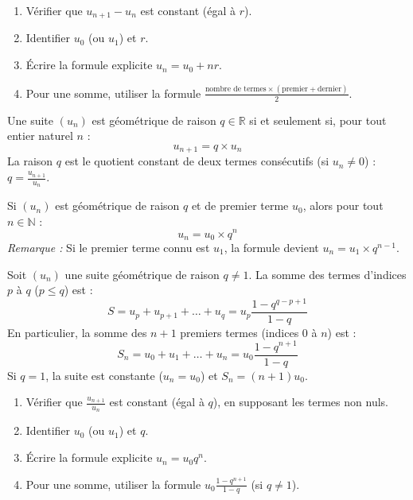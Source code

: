 \documentclass[11pt]{article}
\newcommand{\cle}[1]{{\popxbold\color{popdark}#1}}
\newcounter{popsec}
\newcounter{popsub}
\newcommand{\courssub}[1]{%
  \stepcounter{popsub}%
  \par\vspace{9pt}\noindent{\popxbold\fontsize{11.5}{13}\selectfont\color{popink}{\color{poporange}\thepopsec.\thepopsub}\hspace{6pt}#1}\par\nopagebreak\vspace{4pt}
}
\begin{document}
\begin{methode}
\begin{enumerate}
\item Vérifier que $u_{n+1} - u_n$ est constant (égal à $r$).
\item Identifier $u_0$ (ou $u_1$) et $r$.
\item Écrire la formule explicite $u_n = u_0 + nr$.
\item Pour une somme, utiliser la formule $\frac{\text{nombre de termes} \times (\text{premier} + \text{dernier})}{2}$.
\end{enumerate}
\end{methode}

\courssub{Suites géométriques}

\begin{definition}
Une suite $(u_n)$ est \cle{géométrique} de raison $q \in \mathbb{R}$ si et seulement si, pour tout entier naturel $n$ :
\[ u_{n+1} = q \times u_n \]
La raison $q$ est le quotient constant de deux termes consécutifs (si $u_n \neq 0$) : $q = \frac{u_{n+1}}{u_n}$.
\end{definition}

\begin{propriete}
Si $(u_n)$ est géométrique de raison $q$ et de premier terme $u_0$, alors pour tout $n \in \mathbb{N}$ :
\[ u_n = u_0 \times q^n \]
\emph{Remarque :} Si le premier terme connu est $u_1$, la formule devient $u_n = u_1 \times q^{n-1}$.
\end{propriete}

\begin{propriete}
Soit $(u_n)$ une suite géométrique de raison $q \neq 1$. La somme des termes d'indices $p$ à $q$ ($p \le q$) est :
\[ S = u_p + u_{p+1} + \dots + u_q = u_p \frac{1 - q^{q-p+1}}{1 - q} \]
En particulier, la somme des $n+1$ premiers termes (indices $0$ à $n$) est :
\[ S_n = u_0 + u_1 + \dots + u_n = u_0 \frac{1 - q^{n+1}}{1 - q} \]
Si $q = 1$, la suite est constante ($u_n = u_0$) et $S_n = (n+1)u_0$.
\end{propriete}

\begin{methode}
\begin{enumerate}
\item Vérifier que $\frac{u_{n+1}}{u_n}$ est constant (égal à $q$), en supposant les termes non nuls.
\item Identifier $u_0$ (ou $u_1$) et $q$.
\item Écrire la formule explicite $u_n = u_0 q^n$.
\item Pour une somme, utiliser la formule $u_0 \frac{1-q^{n+1}}{1-q}$ (si $q \neq 1$).
\end{enumerate}
\end{methode}
\end{document}
